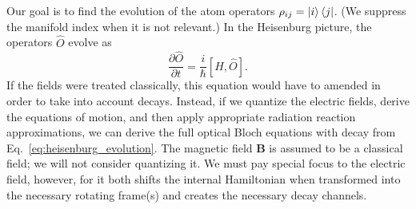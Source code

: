 \documentclass[final,5p,times,twocolumn]{elsarticle}
\begin{document}
Our goal is to find the evolution of the atom operators $\rho_{ij} = \ket{i}\Bra{j}$.  (We suppress the manifold index when it is not relevant.)  In the Heisenburg picture, the operators $\hat{O}$ evolve as
\begin{equation}
	\label{eq:heisenburg_evolution}
	\frac{\partial \hat{O}}{\partial t}  = \frac{i}{\hbar}[\hat{H}, \hat{O}].
\end{equation}
If the fields were treated classically, this equation would have to amended in order to take into account decays.  Instead, if we quantize the electric fields, derive the equations of motion, and then apply appropriate radiation reaction approximations, we can derive the full optical Bloch equations with decay from Eq.~\ref{eq:heisenburg_evolution}.  The magnetic field $\mathbf{B}$ is assumed to be a classical field; we will not consider quantizing it.  We must pay special focus to the electric field, however, for it both shifts the internal Hamiltonian when transformed into the necessary rotating frame(s) and creates the necessary decay channels.
\end{document}
